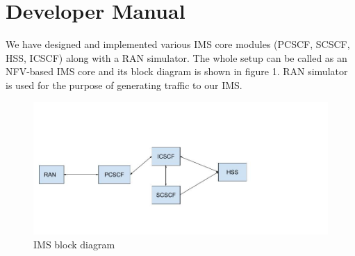 \documentclass[hidelinks]{report}
\begin{document}
\section*{Developer Manual}
We have designed and implemented various IMS core modules (PCSCF, SCSCF, HSS, ICSCF) along with a RAN simulator. The whole setup can be called as an NFV-based IMS core and its block diagram is shown in figure 1. RAN
simulator is used for the purpose of generating traffic to our IMS. 

\begin{figure}[H]
\centering
\includegraphics[scale=0.45]{IMS_Architecture.jpg}
\caption{IMS block diagram}
\label{IMSArchitecture}
\end{figure}
\end{document}
